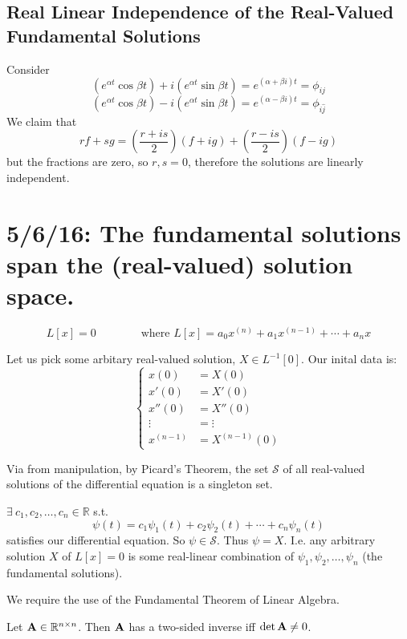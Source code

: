 \documentclass[12pt]{article}
\begin{document}
\subsection{Real Linear Independence of the Real-Valued Fundamental Solutions}
Consider \[ (e^{\alpha t}\cos{\beta t}) + i(e^{\alpha t}\sin{\beta t}) = e^{(\alpha + \beta i)t} = \phi_{ij} \]
\[ (e^{\alpha t}\cos{\beta t}) - i(e^{\alpha t}\sin{\beta t}) = e^{(\alpha - \beta i)t} = \phi_{\hat{i}\hat{j}} \]
We claim that \[ rf + sg = \left(\frac{r+is}{2}\right)(f+ig) + \left(\frac{r-is}{2}\right)(f-ig) \]
but the fractions are zero, so $r,s = 0$, therefore the solutions are linearly independent.

\section{5/6/16: The fundamental solutions span the (real-valued) solution space.}

\[ L[x] = 0 \qquad \qquad \text{where } L[x] = a_0x^{(n)} + a_1x^{(n-1)} + \cdots + a_nx \]

Let us pick some arbitary real-valued solution, $X \in L^{-1}[0]$. Our inital data is:
\[
\begin{cases}
x(0) &= X(0) \\
x'(0) &= X'(0) \\
x''(0) &= X''(0) \\
\vdots &= \vdots \\
x^{(n-1)} &= X^{(n-1)}(0) 
\end{cases}
\]

Via from manipulation, by Picard's Theorem, the set $\mathcal{S}$ of all real-valued solutions of the differential equation is a singleton set.

\begin{theorem}
$\exists \ c_1,c_2,\dots,c_n \in \mathbb{R}$ s.t.
\[ \psi(t) = c_1\psi_1(t) + c_2\psi_2(t) + \cdots + c_n\psi_n(t) \]
satisfies our differential equation. So $\psi \in \mathcal{S}$. Thus $\psi = X$. I.e. any arbitrary solution $X$ of $L[x] = 0$ is some real-linear combination of $\psi_1,\psi_2,\dots,\psi_n$ (the fundamental solutions).
\end{theorem}

We require the use of the Fundamental Theorem of Linear Algebra.
\begin{theorem}
Let ${\bf A} \in \mathbb{R}^{n\times n}$. Then ${\bf A}$ has a two-sided inverse iff $\det{{\bf A}} \neq 0$.
\end{theorem}
\end{document}
